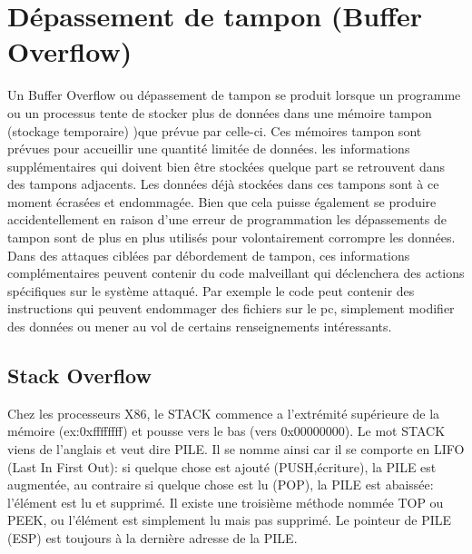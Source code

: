 

\newpage
\section{Dépassement de tampon (Buffer Overflow)}\label{vulnerabilites:applicatives:buffer-overflow}

Un Buffer Overflow ou dépassement de tampon se produit lorsque un programme ou un processus tente de stocker plus de données dans une mémoire tampon (stockage temporaire) )que prévue par celle-ci. Ces mémoires tampon sont prévues pour accueillir une quantité limitée de données. les informations supplémentaires qui doivent bien être stockées quelque part se retrouvent dans des tampons adjacents. Les données déjà stockées dans ces tampons sont à ce moment écrasées et endommagée. Bien que cela puisse également se produire accidentellement en raison d'une erreur de programmation les dépassements de tampon sont de plus en plus utilisés pour volontairement corrompre les données. Dans des attaques ciblées par débordement de tampon, ces informations complémentaires peuvent contenir du code malveillant qui déclenchera des actions spécifiques sur le système attaqué. Par exemple le code peut contenir des instructions qui peuvent endommager des fichiers sur le pc, simplement modifier des données ou mener au vol de certains renseignements intéressants.


\subsection{Stack Overflow}\label{vulnerabilites:applicatives:buffer-overflow:stack}

Chez les processeurs X86, le STACK commence a l’extrémité supérieure de la mémoire (ex:0xffffffff) et pousse vers le bas (vers 0x00000000). Le mot STACK viens de l'anglais et veut dire PILE. Il se nomme ainsi car il se comporte en LIFO (Last In First Out): si quelque chose est ajouté (PUSH,écriture), la PILE est augmentée, au contraire si quelque chose est lu (POP), la PILE est abaissée: l'élément est lu et supprimé. Il existe une troisième méthode nommée TOP ou PEEK, ou l'élément est simplement lu mais pas supprimé. Le pointeur de PILE (ESP) est toujours à la dernière adresse de la PILE.


